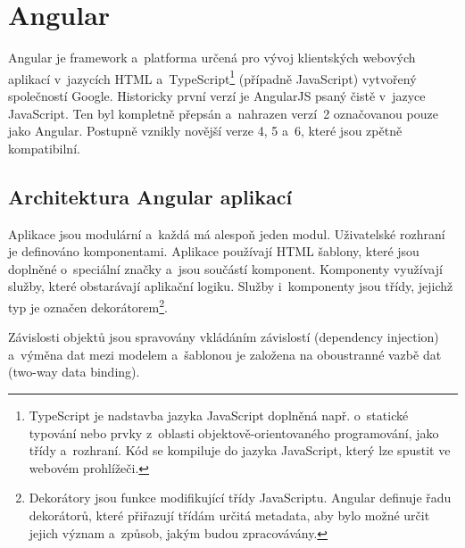 \documentclass[
  digital, %
  oneside, %
  table,   %
  nolof,     %
  nolot,     %
]{fithesis3}
\begin{document}
\section{Angular}
Angular je framework a~platforma určená pro vývoj klientských webových aplikací v~jazycích HTML a~TypeScript\footnote{TypeScript je nadstavba jazyka JavaScript doplněná např. o~statické typování nebo prvky z~oblasti objektově-orientovaného programování, jako třídy a~rozhraní. Kód se kompiluje do jazyka JavaScript, který lze spustit ve webovém prohlížeči.} (případně JavaScript) vytvořený společností Google. Historicky první verzí je AngularJS psaný čistě v~jazyce JavaScript. Ten byl kompletně přepsán a~nahrazen verzí~2 označovanou pouze jako Angular. Postupně vznikly novější verze 4, 5 a~6, které jsou zpětně kompatibilní.\par

\subsection{Architektura Angular aplikací}
Aplikace jsou modulární a~každá má alespoň jeden modul. Uživatelské rozhraní je definováno komponentami. Aplikace používají HTML šablony, které jsou doplněné o~speciální značky a~jsou součástí komponent. Komponenty využívají služby, které obstarávají aplikační logiku. Služby i~komponenty jsou třídy, jejichž typ je označen dekorátorem\footnote{Dekorátory jsou funkce modifikující třídy JavaScriptu. Angular definuje řadu dekorátorů, které přiřazují třídám určitá metadata, aby bylo možné určit jejich význam a~způsob, jakým budou zpracovávány.}.\par
Závislosti objektů jsou spravovány vkládáním závislostí (dependency injection) a~výměna dat mezi modelem a~šablonou je založena na oboustranné vazbě dat (two-way data binding). \cite{angulario}
\end{document}
